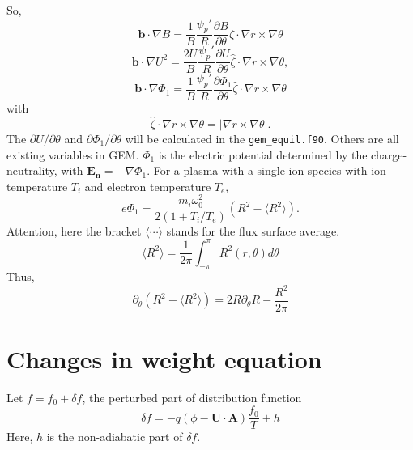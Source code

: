 \documentclass[12pt]{article}
\begin{document}
\begin{CJK*}{UTF8}{gbsn}
So,
\begin{equation}
    \mathbf{b}\cdot\nabla B=\frac{1}{B}\frac{\psi_p'}{R}\frac{\partial B}{\partial \theta}\hat{\zeta}\cdot\nabla r \times \nabla\theta
\end{equation}
\begin{equation}
    \mathbf{b}\cdot\nabla U^2=\frac{2U}{B}\frac{\psi_p'}{R}\frac{\partial U}{\partial \theta}\hat{\zeta}\cdot\nabla r \times \nabla\theta,
\end{equation}
\begin{equation}
    \mathbf{b}\cdot\nabla \Phi_1=\frac{1}{B}\frac{\psi_p'}{R}\frac{\partial \Phi_1}{\partial \theta}\hat{\zeta}\cdot\nabla r \times \nabla\theta
\end{equation}
with
\begin{equation}
    \hat{\zeta}\cdot\nabla r \times \nabla\theta = |\nabla r \times \nabla\theta|.
\end{equation}
The $\partial U/\partial\theta$ and $\partial \Phi_1/\partial\theta$ will be calculated in the \texttt{gem\_equil.f90}. Others are all existing variables in GEM. 
$\Phi_1$ is the electric potential determined by the charge-neutrality, with $\mathbf{E_n}=-\nabla\Phi_1$. For a plasma with a single ion species with ion 
temperature $T_i$ and electron temperature $T_e$, 
\begin{equation}
    e\Phi_1=\frac{m_i\omega_0^2}{2(1+T_i/T_e)}(R^2 - \langle R^2\rangle).
\end{equation}
Attention, here the bracket $\langle\cdots\rangle$ stands for the flux surface average.
\begin{equation}
    \langle R^2\rangle = \frac{1}{2\pi}\int_{-\pi}^{\pi}R^2(r,\theta)d\theta
\end{equation}
Thus,
\begin{equation}
    \partial_{\theta}(R^2 - \langle R^2\rangle) = 2R\partial_{\theta}R-\frac{R^2}{2\pi}
\end{equation}

\newpage
\section{Changes in weight equation} 
Let $f=f_0+\delta f$, the perturbed part of distribution function
\begin{equation}
    \delta f = -q(\phi - \mathbf{U\cdot A})\frac{f_0}{T} + h
\end{equation}
Here, $h$ is the non-adiabatic part of $\delta f$. 


\end{CJK*}
\end{document}
